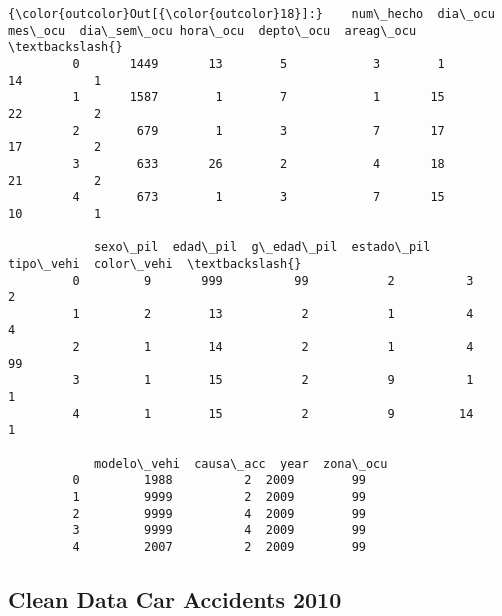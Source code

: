 \documentclass[11pt]{article}
\begin{document}
\begin{Verbatim}[commandchars=\\\{\}]
{\color{outcolor}Out[{\color{outcolor}18}]:}    num\_hecho  dia\_ocu  mes\_ocu  dia\_sem\_ocu hora\_ocu  depto\_ocu  areag\_ocu  \textbackslash{}
         0       1449       13        5            3        1         14          1   
         1       1587        1        7            1       15         22          2   
         2        679        1        3            7       17         17          2   
         3        633       26        2            4       18         21          2   
         4        673        1        3            7       15         10          1   
         
            sexo\_pil  edad\_pil  g\_edad\_pil  estado\_pil  tipo\_vehi  color\_vehi  \textbackslash{}
         0         9       999          99           2          3           2   
         1         2        13           2           1          4           4   
         2         1        14           2           1          4          99   
         3         1        15           2           9          1           1   
         4         1        15           2           9         14           1   
         
            modelo\_vehi  causa\_acc  year  zona\_ocu  
         0         1988          2  2009        99  
         1         9999          2  2009        99  
         2         9999          4  2009        99  
         3         9999          4  2009        99  
         4         2007          2  2009        99  
\end{Verbatim}
            
    \hypertarget{clean-data-car-accidents-2010}{%
\subsection{Clean Data Car Accidents
2010}\label{clean-data-car-accidents-2010}}
\end{document}
